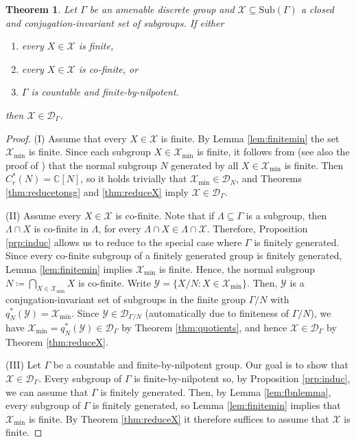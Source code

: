 \documentclass[11pt, oneside, reqno]{amsart}
\newtheorem{thm}{Theorem}[section]
\theoremstyle{definition}
\theoremstyle{remark}
\numberwithin{equation}{section}
\begin{document}
\begin{thm}
\label{thm:bigthm}
Let $\Gamma$ be an amenable discrete group and $\mathcal{X} \subseteq \mathrm{Sub}(\Gamma)$ a closed and conjugation-invariant set of subgroups. If either
    \begin{enumerate}[label=(\Roman*)] 
        \item every $X\in\mathcal{X}$ is finite, 
        \item every $X\in\mathcal{X}$ is co-finite, or
        \item $\Gamma$ is countable and finite-by-nilpotent.
    \end{enumerate}
then $\mathcal{X}\in\mathcal{D}_{\Gamma}$.
\end{thm}
\begin{proof}

    (I) Assume that every $X\in\mathcal{X}$ is finite. By Lemma \ref{lem:finitemin} the set $\mathcal{X}_{\text{min}}$ is finite. Since each subgroup $X\in\mathcal{X}_{\text{min}}$ is finite, it follows from \cite[Lemma~7.9]{Hume} (see also the proof of \cite[Theorem~4.7]{BGHL}) that the normal subgroup $N$ generated by all $X\in\mathcal{X}_{\text{min}}$ is finite. Then $C^*_r(N) = \mathbb{C}[N]$, so it holds trivially that  $\mathcal{X}_{\text{min}} \in \mathcal{D}_{N}$, and Theorems \ref{thm:reducetonsg} and \ref{thm:reduceX} imply $\mathcal{X}\in\mathcal{D}_{\Gamma}$.

    (II) Assume every $X\in\mathcal{X}$ is co-finite. Note that if $\Lambda\subseteq \Gamma$ is a subgroup, then $\Lambda\cap X$ is co-finite in $\Lambda$, for every $\Lambda\cap X\in \Lambda\cap\mathcal{X}$. Therefore, Proposition \ref{prp:induc} allows us to reduce to the special case where $\Gamma$ is finitely generated. Since every co-finite subgroup of a finitely generated group is finitely generated, Lemma \ref{lem:finitemin} implies $\mathcal{X}_{\text{min}}$ is finite. Hence, the normal subgroup $N \coloneq \bigcap_{X\in\mathcal{X}_{\text{min}}} X$ is co-finite. Write $\mathcal{Y} = \{X/N \colon X\in\mathcal{X}_{\text{min}}\}$. Then, $\mathcal{Y}$ is a conjugation-invariant set of subgroups in the finite group $\Gamma/N$ with $q^{*}_{N}(\mathcal{Y}) = \mathcal{X}_{\text{min}}$. Since $\mathcal{Y}\in\mathcal{D}_{\Gamma/N}$ (automatically due to finiteness of $\Gamma/N$), we have $\mathcal{X}_{\text{min}} = q^{*}_{N}(\mathcal{Y})\in\mathcal{D}_{\Gamma}$ by Theorem \ref{thm:quotients}, and hence $\mathcal{X}\in\mathcal{D}_{\Gamma}$ by Theorem \ref{thm:reduceX}.

    (III) Let $\Gamma$ be a countable and finite-by-nilpotent group. Our goal is to show that $\mathcal{X} \in \mathcal{D}_\Gamma$. Every subgroup of $\Gamma$ is finite-by-nilpotent so, by Proposition \ref{prp:induc}, we can assume that $\Gamma$ is finitely generated. Then, by Lemma \ref{lem:fbnlemma}, every subgroup of $\Gamma$ is finitely generated, so Lemma \ref{lem:finitemin} implies that $\mathcal{X}_{\text{min}}$ is finite. By Theorem \ref{thm:reduceX} it therefore suffices to assume that $\mathcal{X}$ is finite.


\end{proof}
\end{document}
